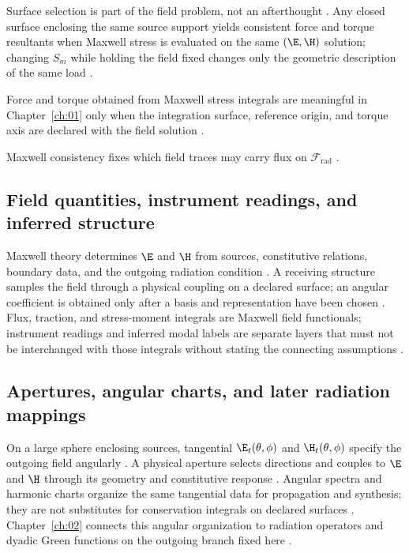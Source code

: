 Surface selection is part of the field problem, not an afterthought \cite{stratton1941}. Any closed surface enclosing the same source support yields consistent force and torque resultants when Maxwell stress is evaluated on the same $(\E,\H)$ solution; changing $S_m$ while holding the field fixed changes only the geometric description of the same load \cite{maxwell1873,stratton1941}.

\label{prop:ch1.stress-torque-admissibility}
Force and torque obtained from Maxwell stress integrals are meaningful in Chapter~\ref{ch:01} only when the integration surface, reference origin, and torque axis are declared with the field solution \cite{stratton1941,beth1936}.

Maxwell consistency fixes which field traces may carry flux on $\mathcal{F}_{\mathrm{rad}}$ \cite{stratton1941}.
\subsection{Field quantities, instrument readings, and inferred structure}
\label{sec:ch01.5.3}

Maxwell theory determines $\E$ and $\H$ from sources, constitutive relations, boundary data, and the outgoing radiation condition \cite{maxwell1873,stratton1941}. A receiving structure samples the field through a physical coupling on a declared surface; an angular coefficient is obtained only after a basis and representation have been chosen \cite{poynting1884,beth1936,hansen1988}. Flux, traction, and stress-moment integrals are Maxwell field functionals; instrument readings and inferred modal labels are separate layers that must not be interchanged with those integrals without stating the connecting assumptions \cite{stratton1941}.

\subsection{Apertures, angular charts, and later radiation mappings}
\label{sec:ch01.5.4}

On a large sphere enclosing sources, tangential $\E_t(\theta,\phi)$ and $\H_t(\theta,\phi)$ specify the outgoing field angularly \cite{stratton1941}. A physical aperture selects directions and couples to $\E$ and $\H$ through its geometry and constitutive response \cite{hansen1988}. Angular spectra and harmonic charts organize the same tangential data for propagation and synthesis; they are not substitutes for conservation integrals on declared surfaces \cite{harrington2001,stratton1941}. Chapter~\ref{ch:02} connects this angular organization to radiation operators and dyadic Green functions on the outgoing branch fixed here \cite{harrington2001,tai1994}.

